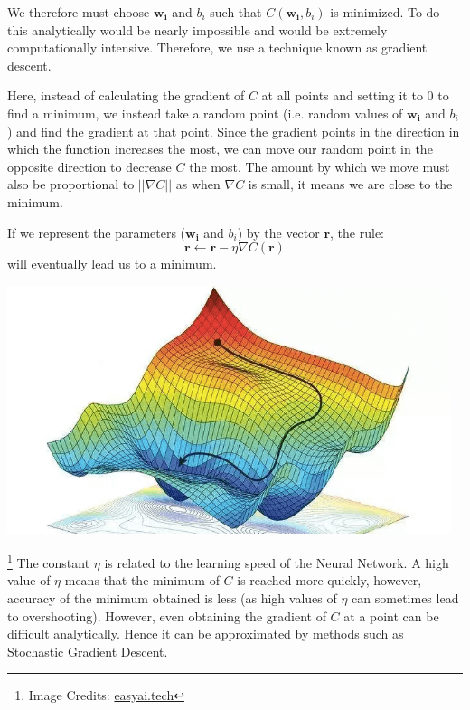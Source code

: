 \documentclass[12 pt]{report}
\begin{document}
    We therefore must choose $\bm{w_{i}}$ and $b_{i}$ such that $C(\bm{w_{i}}, b_{i})$ is minimized. To do this analytically would be nearly impossible and would be 
    extremely computationally intensive. Therefore, we use a technique known as gradient descent. 

    Here, instead of calculating the gradient of $C$ at all points and setting it to $0$ to find a minimum, we instead take a random point (i.e. random values of 
    $\bm{w_{i}}$ and $b_{i}$) and find the gradient at that point. Since the gradient points in the direction in which the function increases the most, we can move our random 
    point in the opposite direction to decrease $C$ the most. The amount by which we move must also be proportional to $||\nabla C||$ as when $\nabla C$ is small, it means we 
    are close to the minimum.

    If we represent the parameters ($\bm{w_{i}}$ and $b_{i}$) by the vector $\bm{r}$, the rule:
    \begin{equation}
        \bm{r} \leftarrow \bm{r} - \eta\nabla C(\bm{r})
    \end{equation}
    will eventually lead us to a minimum.

    \begin{center}
        \includegraphics[width=13cm]{grad-descent.png}
    \end{center}

    \footnote {Image Credits: \href{https://easyai.tech/en/ai-definition/gradient-descent/}{easyai.tech}} The constant $\eta$ is related to the learning speed of the Neural Network. A high value of $\eta$ means that the minimum of $C$ is reached more quickly,
    however, accuracy of the minimum obtained is less (as high values of $\eta$ can sometimes lead to overshooting). However, even obtaining the gradient of $C$ 
    at a point can be difficult analytically. Hence it can be approximated by methods such as Stochastic Gradient Descent.
\end{document}

